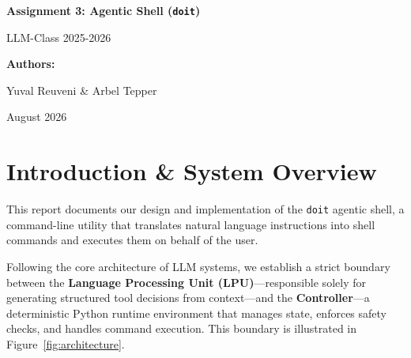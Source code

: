 \documentclass[11pt,a4paper]{article}
\begin{document}
\begin{titlepage}
    \centering
    \vspace*{2cm}
    {\Huge\bfseries\color{primary} Assignment 3: Agentic Shell (\texttt{doit}) \par}
    \vspace{0.5cm}
    {\large\color{secondary} LLM-Class 2025-2026 \par}
    \vspace{3cm}
    {\large\bfseries Authors: \par}
    {\large Yuval Reuveni \& Arbel Tepper \par}
    \vspace{1.5cm}
    
    \vfill
    {\large\color{secondary} August 2026 \par}
\end{titlepage}

\tableofcontents
\newpage

\section{Introduction \& System Overview}
\label{sec:intro}
This report documents our design and implementation of the \texttt{doit} agentic shell, a command-line utility that translates natural language instructions into shell commands and executes them on behalf of the user.

Following the core architecture of LLM systems, we establish a strict boundary between the \textbf{Language Processing Unit (LPU)}—responsible solely for generating structured tool decisions from context—and the \textbf{Controller}—a deterministic Python runtime environment that manages state, enforces safety checks, and handles command execution. This boundary is illustrated in Figure~\ref{fig:architecture}.
\end{document}
